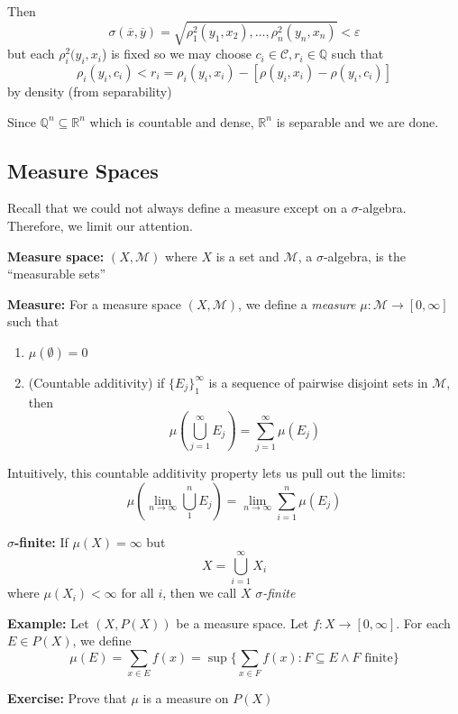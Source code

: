 \documentclass[12pt]{report}
\newcommand{\R}{\mathbb{R}}
\newcommand{\Q}{\mathbb{Q}}
\newcommand{\ep}{\varepsilon}
\newcommand{\M}{\mathcal{M}}
\newcommand{\sub}{\subseteq}
\renewcommand{\bar}[1]{\overline{#1}}
\newenvironment*{tbox}[2][gray]{
    \begin{tcolorbox}[
        parbox=false,
        colback=#1!5!white,
        colframe=#1!75!black,
        breakable,
        title={#2}
    ]}
    {\end{tcolorbox}}
\newenvironment*{exercise}[1][red]{
    \begin{tcolorbox}[
        parbox=false,
        colback=#1!5!white,
        colframe=#1!75!black,
        breakable
    ]}
    {\end{tcolorbox}}
\newenvironment*{proof}[1][blue]{
\begin{tcolorbox}[
    parbox=false,
    colback=#1!5!white,
    colframe=#1!75!black,
    breakable
]}
{\end{tcolorbox}}
\begin{document}
\begin{tbox}{\textbf{Proposition:} $B_{\R^n}$ is  }
\begin{proof}
            Then 
            \[\sigma(\bar x, \bar y) = \sqrt{\rho_1^2(y_1, x_2), \dots, \rho_n^2(y_n, x_n)} < \ep\]
            but each $\rho_i^2(y_i, x_i$) is fixed so we may choose $c_i \in \mathcal C, r_i \in \Q$ such that 
            \[\rho_i(y_i, c_i) < r_i = \rho_i(y_i, x_i) - [\rho(y_i, x_i) - \rho(y_i, c_i)]\]
            by density (from separability) 


        \end{proof}

        Since $\Q^n \sub \R^n$ which is countable and dense, $\R^n$ is separable and we are done. 
    \end{tbox}

    \subsection*{Measure Spaces}
        Recall that we could not always define a measure except on a $\sigma$-algebra. Therefore, we limit our attention.

        \textbf{Measure space:} $(X, \M)$ where $X$ is a set and $\M$, a $\sigma$-algebra, is the ``measurable sets''

        \textbf{Measure:} For a measure space $(X, \M)$, we define a \emph{measure} $\mu: \M \to [0, \infty]$ such that 
        \begin{enumerate}
            \item $\mu(\emptyset) = 0$
            \item (Countable additivity) if $\{E_j\}_1^{\infty}$ is a sequence of pairwise disjoint sets in $\M$, then 
            \[\mu\left(\bigcup_{j=1}^{\infty} E_j\right) = \sum_{j=1}^{\infty} \mu(E_j)\] 
        \end{enumerate}

        Intuitively, this countable additivity property lets us pull out the limits:
        \[\mu\left(\lim_{n \to \infty} \bigcup_{1}^n E_j\right) = \lim_{n\to \infty} \sum_{i=1}^n \mu(E_j)\] 

        \textbf{$\sigma$-finite:} If $\mu(X) = \infty$ but 
        \[X = \bigcup_{i=1}^{\infty} X_i\]
        where $\mu(X_i) < \infty$ for all $i$, then we call $X$ \emph{$\sigma$-finite}

        \textbf{Example:} Let $(X, P(X))$ be a measure space. Let $f: X \to [0, \infty]$. For each $E \in P(X)$, we define 
        \[\mu(E) = \sum_{x \in E} f(x) = \sup\{\sum_{x \in F} f(x): F \sub E \land F \text{ finite}\}\] 

        \begin{exercise}
            \textbf{Exercise:} Prove that $\mu$ is a measure on $P(X)$
        \end{exercise}
\end{document}
